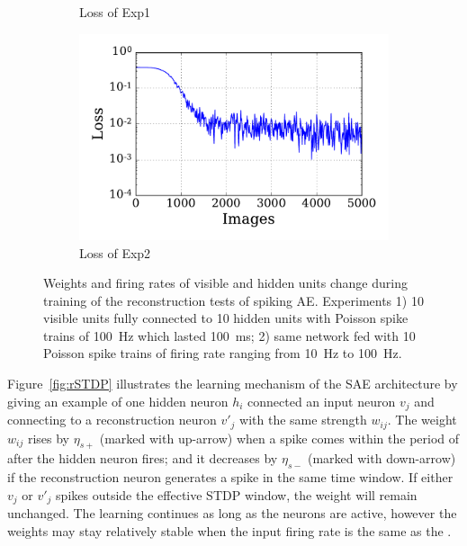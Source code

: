 \begin{figure}
\begin{subfigure}[t]{0.45\textwidth}
		\caption{Loss of Exp1}
	\end{subfigure}
	\begin{subfigure}[t]{0.45\textwidth}
		\includegraphics[width=\textwidth]{pics_sdlm/00_exp_SAE_Orig/exp2_mse_nons.pdf}
		\caption{Loss of Exp2}
	\end{subfigure}
	\caption{Weights and firing rates of visible and hidden units change during training of the reconstruction tests of spiking AE. 
		Experiments 1) 10 visible units fully connected to 10 hidden units with Poisson spike trains of 100~Hz which lasted 100~ms; 2) \DIFaddbeginFL {}\DIFaddendFL same network fed with 10 Poisson spike trains of firing rate ranging from 10~Hz to 100~Hz.}
	\label{fig:SAE_orig}
\end{figure}

Figure~\ref{fig:rSTDP} illustrates the learning mechanism of the SAE architecture by giving an example of one hidden neuron $h_i$ connected \DIFdelbegin {}\DIFdelend \DIFaddbegin {}\DIFaddend an input neuron $v_j$ and connecting to a reconstruction neuron $v'_j$ with the same strength $w_{ij}$.
The weight $w_{ij}$ rises by $\eta_{s+}$ (marked with \DIFaddbegin {}\DIFaddend up-arrow) when a spike comes within the period of \DIFdelbegin {}\DIFdelend \DIFaddbegin {}\DIFaddend after the hidden neuron fires;
and it decreases by $\eta_{s-}$ (marked with \DIFaddbegin {}\DIFaddend down-arrow) if the reconstruction neuron generates a spike in the same time window.
If either $v_j$ or $v'_j$ spikes outside the effective STDP window, the weight will remain unchanged.
The learning continues as long as the neurons are active, however the weights may stay relatively stable when the input firing rate is the same as the \DIFdelbegin {}\DIFdelend \DIFaddbegin {}\DIFaddend .

